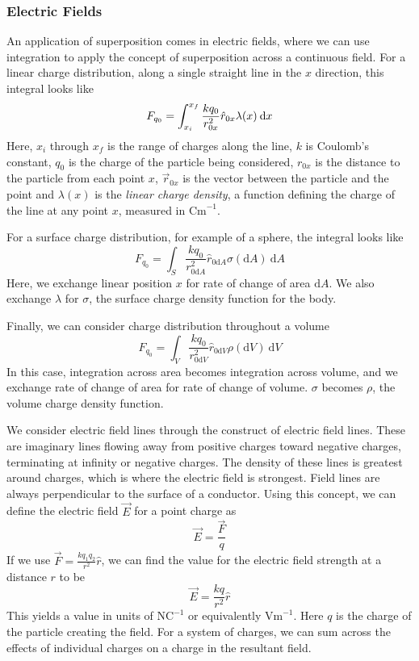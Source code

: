 \documentclass[12pt]{report}
\begin{document}
\begin{flushleft}
\subsubsection*{Electric Fields}
An application of superposition comes in electric fields, where we can use
integration to apply the concept of superposition across a continuous field.
For a linear charge distribution, along a single straight line in the \(x\) 
direction, this integral looks like  
\[F_{q_0} = \int_{x_i}^{x_f} \frac{kq_0}{r_{0x}^2}\hat{r}_{0x}\lambda(x)\:\mathrm{d}x\]
Here, \(x_i\) through \(x_f\) is the range of charges along the line, \(k\) is
Coulomb's constant, \(q_0\) is the charge of the particle being considered, 
\(r_{0x}\) is the distance to the particle from each point \(x\), 
\(\vec{r}_{0x}\) is the vector between the particle and the point and
\(\lambda(x)\) is the \textit{linear charge density}, a function defining the
charge of the line at any point \(x\), measured in \(\mathrm{Cm}^{-1}\). \par
For a surface charge distribution, for example of a sphere, the integral
looks like
\[F_{q_0} = \int_{S} \frac{kq_0}{r_{0\mathrm{d}A}^2}\hat{r}_{0\mathrm{d}A}
\sigma(\mathrm{d}A)\:\mathrm{d}A\]
Here, we exchange linear position \(x\) for rate of change of area 
\(\mathrm{d}A\). We also exchange \(\lambda\) for \(\sigma\), the surface
charge density function for the body. \par
Finally, we can consider charge distribution throughout a volume
\[F_{q_0} = \int_{V} \frac{kq_0}{r_{0\mathrm{d}V}^2}\hat{r}_{0\mathrm{d}V}
\rho(\mathrm{d}V)\:\mathrm{d}V\]
In this case, integration across area becomes integration across volume, and
we exchange rate of change of area for rate of change of volume. \(\sigma\)
becomes \(\rho\), the volume charge density function.

\bigskip
We consider electric field lines through the construct of electric field lines.
These are imaginary lines flowing away from positive charges toward negative
charges, terminating at infinity or negative charges. The density of these 
lines is greatest around charges, which is where the electric field is 
strongest. Field lines are always perpendicular to the surface of a conductor.
Using this concept, we can define the electric field \(\vec{E}\) for a point
charge as
\[\vec{E} = \frac{\vec{F}}{q}\]
If we use \(\vec{F} = \frac{kq_1q_2}{r^2}\hat{r}\), we can find the value for
the electric field strength at a distance \(r\) to be
\[\vec{E} = \frac{kq}{r^2}\hat{r}\]
This yields a value in units of \(\mathrm{NC}^{-1}\) or equivalently 
\(\mathrm{Vm}^{-1}\). Here \(q\) is the charge of the particle creating the 
field. For a system of charges, we can sum across the effects of individual
charges on a charge in the resultant field.


\end{flushleft}
\end{document}

